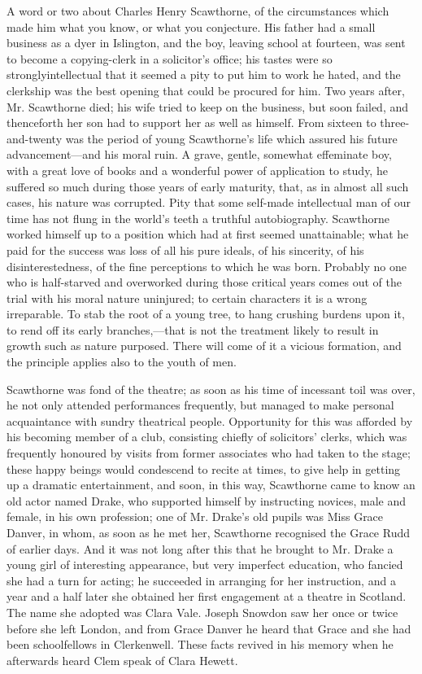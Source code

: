 A word or two about Charles Henry Scawthorne, of the circumstances which
made him what you know, or what you conjecture. His father had a small
business as a dyer in Islington, and the boy, leaving school at
fourteen, was sent to become a copying-clerk in a {}solicitor's office;
his tastes were so stronglyintellectual that it seemed a pity to put him
to work he hated, and the clerkship was the best opening that could be
procured for him. Two years after, Mr. Scawthorne died; his wife tried
to keep on the business, but soon failed, and thenceforth her son had to
support her as well as himself. From sixteen to three-and-twenty was the
period of young Scawthorne's life which assured his future
advancement---and his moral ruin. A grave, gentle, somewhat effeminate
boy, with a great love of books and a wonderful power of application to
study, he suffered so much during those years of early maturity, that,
as in almost all such cases, his nature was corrupted. Pity that some
self-made intellectual man of our time has not flung in the world's
teeth a truthful autobiography. Scawthorne worked himself up to a
position which had at first seemed unattainable; what he paid for the
success was loss of all his pure ideals, of his sincerity, of his
disinterestedness, of the fine perceptions to which he was born.
{}Probably no one who is half-starved and overworked during those
critical years comes out of the trial with his moral nature uninjured;
to certain characters it is a wrong irreparable. To stab the root of a
young tree, to hang crushing burdens upon it, to rend off its early
branches,---that is not the treatment likely to result in growth such as
nature purposed. There will come of it a vicious formation, and the
principle applies also to the youth of men.

Scawthorne was fond of the theatre; as soon as his time of incessant
toil was over, he not only attended performances frequently, but managed
to make personal acquaintance with sundry theatrical people. Opportunity
for this was afforded by his becoming member of a club, consisting
chiefly of solicitors' clerks, which was frequently honoured by visits
from former associates who had taken to the stage; these happy beings
would condescend to recite at times, to give help in getting up a
dramatic entertainment, and soon, in this way, Scawthorne came to know
an old actor named {}Drake, who supported himself by instructing
novices, male and female, in his own profession; one of Mr. Drake's old
pupils was Miss Grace Danver, in whom, as soon as he met her, Scawthorne
recognised the Grace Rudd of earlier days. And it was not long after
this that he brought to Mr. Drake a young girl of interesting
appearance, but very imperfect education, who fancied she had a turn for
acting; he succeeded in arranging for her instruction, and a year and a
half later she obtained her first engagement at a theatre in Scotland.
The name she adopted was Clara Vale. Joseph Snowdon saw her once or
twice before she left London, and from Grace Danver he heard that Grace
and she had been schoolfellows in Clerkenwell. These facts revived in
his memory when he afterwards heard Clem speak of Clara Hewett.

